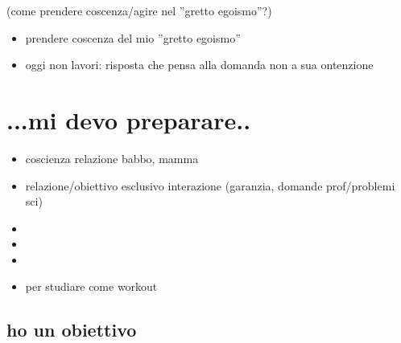 (come prendere coscenza/agire nel ''gretto egoismo''?)

\begin{itemize}
\item prendere coscenza del mio ''gretto egoismo''
\item oggi non lavori: risposta che pensa alla domanda non a sua ontenzione
\end{itemize}


\section{...mi devo preparare..}\label{concretezza}

\begin{itemize}
\item coscienza relazione babbo, mamma
\item relazione/obiettivo esclusivo interazione (garanzia, domande prof/problemi sci)
\item {}
\item {}
\item {}
\item per studiare come workout
\end{itemize}

\subsection{ho un obiettivo}

